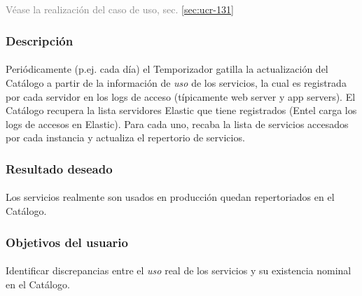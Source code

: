 \subsection{\ucCXxxiFullName{}}\label{uc-131}
\textcolor{gray}{V\'ease la realizaci\'on del caso de uso, sec. \ref{sec:ucr-131}}

\subsubsection*{Descripci\'on}
\paragraph{}
Peri\'odicamente (p.ej. cada d\'ia)
el Temporizador gatilla la actualizaci\'on del Cat\'alogo
a partir de la informaci\'on de \emph{uso} de los servicios,
la cual es registrada por cada servidor en los logs de acceso
(t\'ipicamente web server y app servers).
%
El Cat\'alogo recupera la lista servidores Elastic que tiene registrados
(Entel carga los logs de accesos en Elastic).
Para cada uno, recaba la lista de servicios accesados por cada instancia
y actualiza el repertorio de servicios.


\subsubsection*{Resultado deseado}
\paragraph{}
Los servicios realmente son usados en producci\'on quedan repertoriados en el Cat\'alogo.


\subsubsection*{Objetivos del usuario}
\paragraph{}
Identificar discrepancias entre el \emph{uso} real de los servicios
y su existencia nominal en el Cat\'alogo.


